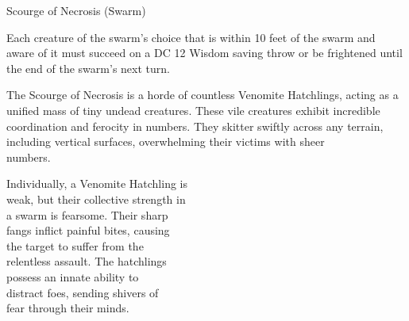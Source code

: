 \documentclass[letterpaper,openany,twoside,twocolumn]{book}
\begin{document}
\begin{DndMonster}[width=0.5\textwidth]{Scourge of Necrosis (Swarm)}
	\DndMonsterAttack[
      name=Bite,
      distance=melee, %
      mod=+5,
      reach=0,
      targets=one target,
      dmg=\DndDice{4d4},
      dmg-type=piercing,
      or-dmg=\DndDice{2d4},
      or-dmg-when={if the swarm has half of its hit points or fewer},
    ]
    
    Each creature of the swarm's choice that is within 10 feet of the swarm and aware of it must succeed on a DC 12 Wisdom saving throw or be frightened until the end of the swarm's next turn.
      
\end{DndMonster}

The Scourge of Necrosis is a horde of countless Venomite Hatchlings, acting as a unified mass of tiny undead creatures. These vile creatures exhibit incredible coordination and ferocity in numbers. They skitter swiftly across any terrain, including vertical surfaces, overwhelming their victims with sheer\\numbers.

Individually, a Venomite Hatchling is\\weak, but their collective strength in\\a swarm is fearsome. Their sharp\\fangs inflict painful bites, causing\\the target to suffer from the\\relentless assault. The hatchlings\\possess an innate ability to\\distract foes, sending shivers of\\fear through their minds.

\vfill\eject %

\vspace*{0.75cm}\hspace*{6.5cm}\vspace*{-2cm}%
\end{document}
